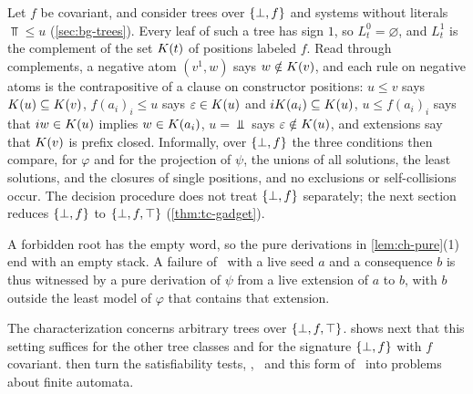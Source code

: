 \begin{remark}\label{rem:ch-one-sign}
Let $f$ be covariant, and consider trees over $\{\bot,f\}$ and systems without
literals $\Top\le u$ (\cref{sec:bg-trees}). Every leaf of such a tree has
sign $1$, so $L^0_t=\varnothing$, and $L^1_t$ is the complement of the set
$K(t)$ of positions labeled $f$. Read through complements, a negative atom
$(v^1,w)$ says $w\notin K(v)$, and each rule on negative atoms is the
contrapositive of a clause on constructor positions: $u\le v$ says
$K(u)\subseteq K(v)$, $f(a_i)_i\le u$ says $\varepsilon\in K(u)$ and
$iK(a_i)\subseteq K(u)$, $u\le f(a_i)_i$ says that $iw\in K(u)$
implies $w\in K(a_i)$, $u=\Bot$ says $\varepsilon\notin K(u)$, and extensions
say that $K(v)$ is prefix closed. Informally, over $\{\bot,f\}$ the three
conditions then compare, for $\varphi$ and for the projection of $\psi$, the
unions of all solutions, the least solutions, and the closures of single
positions, and no exclusions or self-collisions occur. The decision procedure
does not treat $\{\bot,f\}$ separately; the next section reduces $\{\bot,f\}$ to $\{\bot,f,\top\}$
(\cref{thm:tc-gadget}).
\end{remark}

A forbidden root has the empty word, so the pure derivations in
\cref{lem:ch-pure}(1) end with an empty stack. A failure of \CondII\ with a
live seed $a$ and a consequence $b$ is thus witnessed by a pure derivation of
$\psi$ from a live extension of $a$ to $b$, with $b$ outside the least model
of $\varphi$ that contains that extension.

The characterization concerns arbitrary trees over $\{\bot,f,\top\}$. 
shows next that this setting suffices for the other tree classes and for the
signature $\{\bot,f\}$ with $f$ covariant.  then turn the
satisfiability tests, \CondI, \CondU\ and this form of \CondII\ into problems
about finite automata.
